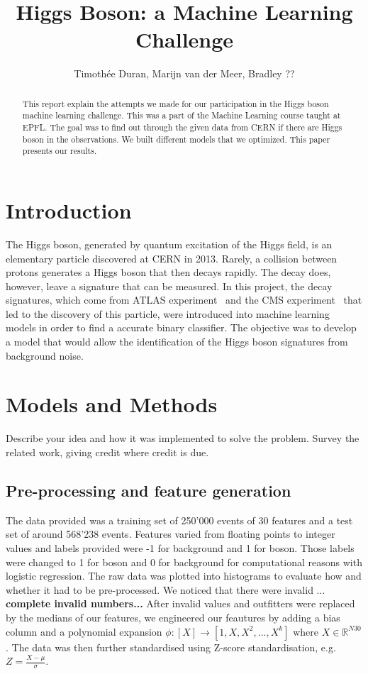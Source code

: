 \documentclass[10pt,conference,compsocconf]{IEEEtran}
\begin{document}
\title{Higgs Boson: a Machine Learning Challenge}

\author{
  Timothée Duran, Marijn van der Meer, Bradley ?? 
}

\maketitle

\begin{abstract}

 This report explain the attempts we made for our participation in the Higgs boson machine learning challenge. This was a part of the Machine Learning course taught at EPFL. The goal was to find out through the given data from CERN if there are Higgs boson in the observations. We built different models that we optimized. This paper presents our results. 
\end{abstract}

\section{Introduction}\label{sec: introduction}
The Higgs boson, generated by quantum excitation of the Higgs field, is an elementary particle discovered at CERN in 2013. Rarely, a collision between protons generates a Higgs boson that then decays rapidly. The decay does, however, leave a signature that can be measured. In this project, the decay signatures, which come from ATLAS experiment~\cite{Aad_2012} and the CMS experiment~\cite{Chatrchyan_2012} that led to the discovery of this particle, were introduced into machine learning models in order to find a accurate binary classifier. The objective was to develop a model that would allow the identification of the Higgs boson signatures from background noise.
\section{Models and Methods}\label{sec: models_methods}
Describe your idea and how it was implemented to solve
  the problem. Survey the related work, giving credit where credit is
  due.
  \subsection{Pre-processing and feature generation}\label{subsec:pre-proc}
  The data provided was a training set of 250'000 events of 30 features and a test set of around 568'238 events. Features varied from floating points to integer values and labels provided were -1 for background and 1 for boson. Those labels were changed to 1 for boson and 0 for background for computational reasons with logistic regression.  The raw data was plotted into histograms to evaluate how and whether it had to be pre-processed. We noticed that there were invalid ...
    \textbf{complete invalid numbers...}
    After invalid values and outfitters were replaced by the medians of our features, we engineered our feautures by adding a bias column and a polynomial expansion $\phi:[X]\rightarrow [1, X, X^2,...,X^k]$ where $X\in \mathbb{R}^{N30}$. The data was then further standardised using Z-score standardisation, e.g. $Z = \frac{X - \mu}{\sigma}$.
    
\end{document}
